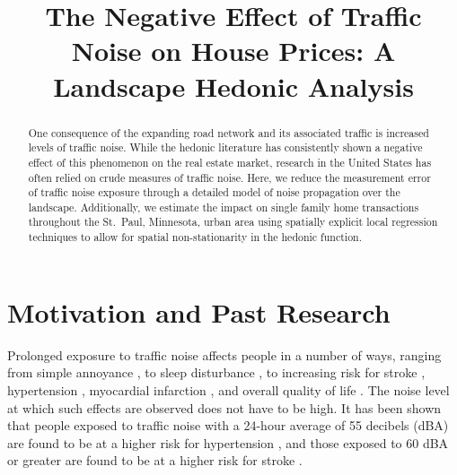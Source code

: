 \documentclass{article}\usepackage{graphicx, color}
\title{The Negative Effect of Traffic Noise on House Prices: A Landscape Hedonic Analysis}
\date{}
\author{}%
\begin{document}
\maketitle
{}
\begin{singlespace}
\begin{abstract}
One consequence of the expanding road network and its associated traffic is increased levels of traffic noise.  While the hedonic literature has consistently shown a negative effect of this phenomenon on the real estate market, research in the United States has often relied on crude measures of traffic noise. Here, we reduce the measurement error of traffic noise exposure through a detailed model of noise propagation over the landscape. Additionally, we estimate the impact on single family home transactions throughout the St.\ Paul, Minnesota, urban area using spatially explicit local regression techniques to allow for spatial non-stationarity in the hedonic function. 
\end{abstract}
\end{singlespace}

\clearpage
{} 

\linenumbers

\section{Motivation and Past Research}\label{sec:lit}
Prolonged exposure to traffic noise affects people in a number of ways, ranging from simple annoyance \citep{Miedema2001, Ouis2001, Ohrstrom2007, DeKluizenaar2013, Weinhold2013}, to sleep disturbance , to increasing risk for stroke \citep{Sorensen2011}, hypertension \citep{Jarup2008, Bodin2009}, myocardial infarction \citep{Babisch2005}, and overall quality of life \citep{Shepherd2013}. The noise level at which such effects are observed does not have to be high.  It has been shown that people exposed to traffic noise with a 24-hour average of 55 decibels (dBA) are found to be at a higher risk for hypertension \citep{Barregard2009, Bodin2009}, and those exposed to 60 dBA or greater are found to be at a higher risk for stroke \citep{Sorensen2011}.  
\end{document}
